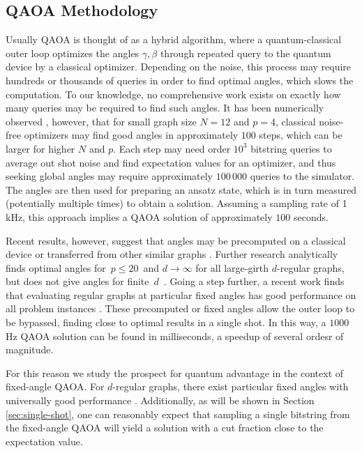 \documentclass[prb,reprint,nofootinbib,longbibliography,superscriptaddress]{revtex4-1}
\begin{document}
\subsection{QAOA Methodology}


Usually  QAOA is thought of as a hybrid algorithm, where a quantum-classical outer loop optimizes the angles $\gamma,\beta$ through repeated query to the quantum device by a classical optimizer. Depending on the noise, this process may require hundreds or thousands of queries in order to find optimal angles, which slows the computation. To our knowledge,  no comprehensive work exists on exactly how many queries may be required to find such angles. It has been numerically observed \cite{Shaydulin_2019,Zhou2020}, however, that for small graph size $N=12$ and $p=4$, classical noise-free optimizers may find good angles in approximately $100$ steps, which can be larger for higher $N$ and $p$. Each step may need order $10^3$  bitstring queries to average out shot noise and find expectation values for an optimizer, and thus seeking global angles may require approximately $100\,000$ queries to the simulator.
The angles are then used for preparing an ansatz state, which is in turn measured (potentially multiple times) to obtain a solution.
Assuming a sampling rate of 1 kHz, this approach implies a QAOA solution of approximately  $100$ seconds.


 Recent results, however, suggest that angles may be precomputed on a classical device \cite{streif2019training} or transferred from other similar graphs \cite{galda2021transferability}.
 Further research analytically finds optimal angles for~$p\leq20$~and $d\to\infty$ 
 for all large-girth $d$-regular graphs, but does not give angles for finite~$d$~\cite{Basso2022}.
 Going a step further, a recent work finds that evaluating regular graphs at particular fixed angles has good performance on all problem instances \cite{Wurtz_guarantee}. These precomputed or fixed angles allow the outer loop to be bypassed, finding close to optimal results in a single shot. In this way, a $1000$ Hz QAOA solution can be found in  milliseconds, a speedup of several ordesr of magnitude. 


For this reason we study the prospect for quantum advantage in the context of fixed-angle QAOA. For $d$-regular graphs, there exist particular fixed angles with universally good performance \cite{wurtz2021fixed}. 
Additionally, as will be shown in Section \ref{sec:single-shot}, one can reasonably expect that sampling a single bitstring from the fixed-angle QAOA will yield a solution with a cut fraction close to the expectation value.
\end{document}
